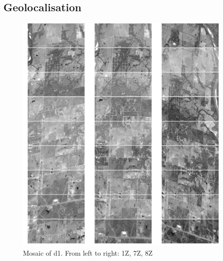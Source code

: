 \documentclass[paper=a4, fontsize=11pt, onecolumn, tikz, dvipsnames, svgnames, x11names]{article}
\begin{document}
\subsection{Geolocalisation}

\newpage
\begin{figure}
    \centering
    \includegraphics[width = 0.95\textwidth]{d1.png}
    \caption{Mosaic of d1. From left to right: 1Z, 7Z, 8Z}
    \label{}
\end{figure}
\end{document}
